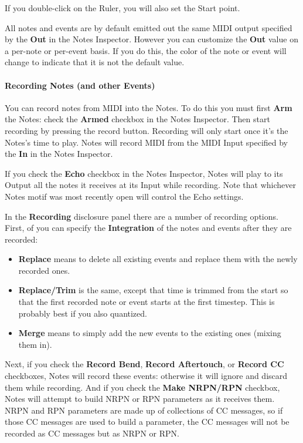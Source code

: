 \documentclass[twoside,10pt]{article}
\begin{document}
If you double-click on the Ruler, you will also set the Start point.

All notes and events are by default emitted out the same MIDI output specified by the {\bf Out} in the Notes Inspector.  However you can customize the {\bf Out} value on a per-note or per-event basis.  If you do this, the color of the note or event will change to indicate that it is not the default value.

\paragraph{Recording Notes (and other Events)}

You can record notes from MIDI into the Notes.  To do this you must first {\bf Arm} the Notes: check the {\bf Armed} checkbox in the Notes Inspector.  Then start recording by pressing the record button.  Recording will only start once it's the Notes's time to play.  Notes will record MIDI from the MIDI Input specified by the {\bf In} in the Notes Inspector.

If you check the {\bf Echo} checkbox in the Notes Inspector, Notes will play to its Output all the notes it receives at its Input while recording.  Note that whichever Notes motif was most recently open will control the Echo settings.

In the {\bf Recording} disclosure panel there are a number of recording options.   First, of you can specify the {\bf Integration} of the notes and events after they are recorded:

\begin{itemize}
\item {\bf Replace} means to delete all existing events and replace them with the newly recorded ones.
\item {\bf Replace/Trim} is the same, except that time is trimmed from the start so that the first recorded note or event starts at the first timestep.  This is probably best if you also quantized.
\item {\bf Merge} means to simply add the new events to the existing ones (mixing them in).
\end{itemize}

Next, if you check the {\bf Record Bend}, {\bf Record Aftertouch}, or {\bf Record CC} checkboxes, Notes will record these events: otherwise it will ignore and discard them while recording.   And if you check the {\bf Make NRPN/RPN} checkbox, Notes will attempt to build NRPN or RPN parameters as it receives them.  NRPN and RPN parameters are made up of collections of CC messages, so if those CC messages are used to build a parameter, the CC messages will not be recorded as CC messages but as NRPN or RPN.
\end{document}
